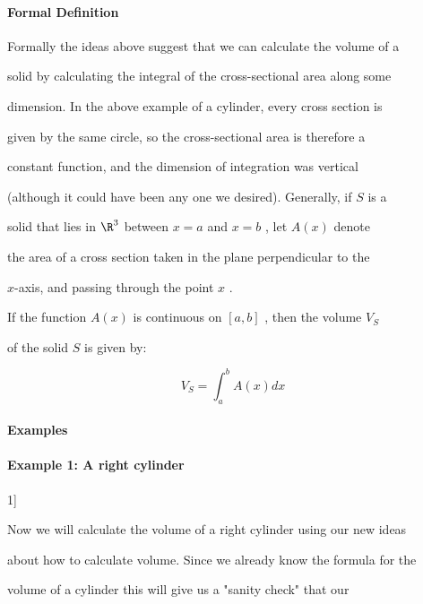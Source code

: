 \paragraph{Formal Definition}



Formally the ideas above suggest that we can calculate the volume of a

solid by calculating the integral of the cross-sectional area along some

dimension. In the above example of a cylinder, every cross section is

given by the same circle, so the cross-sectional area is therefore a

constant function, and the dimension of integration was vertical

(although it could have been any one we desired). Generally, if $S$ is a

solid that lies in $\R^3$ between $x=a$ and $x=b$ , let $A(x)$ denote

the area of a cross section taken in the plane perpendicular to the

$x$-axis, and passing through the point $x$ .



If the function $A(x)$ is continuous on $[a,b]$ , then the volume $V _S$

of the solid $S$ is given by:



$$V _S = \int _a^b A(x) dx$$



\paragraph{Examples}



\paragraph{Example 1: A right cylinder}




1]



Now we will calculate the volume of a right cylinder using our new ideas

about how to calculate volume. Since we already know the formula for the

volume of a cylinder this will give us a "sanity check" that our

